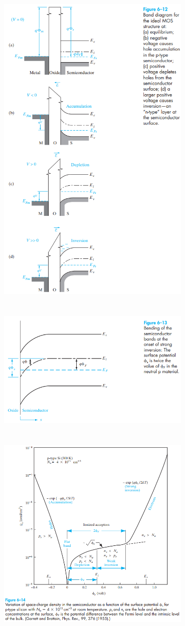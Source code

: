 \documentclass[8pt]{article}
\newcommand{\hl}{\noindent\makebox[\linewidth]{\rule{\textwidth}{0.2pt}}}
\begin{document}
\begin{center}
		\includegraphics[width=0.7\textwidth]{fig6-12} \\ \hl \\~\\
		\includegraphics[width=0.7\textwidth]{fig6-13} \\ \hl \\~\\
		\includegraphics[width=0.7\textwidth]{fig6-14} \\ \hl \\~\\

\end{center}
\end{document}
